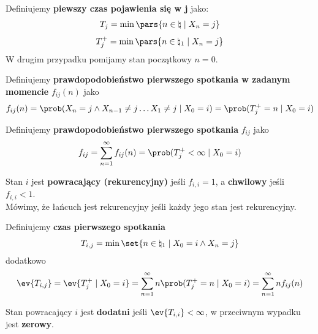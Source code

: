 \begin{definition}
	Definiujemy \textbf{piewszy czas pojawienia się w j} jako:
	\[
		T_j = \min\pars{n \in \natural \mid X_n = j}
	\]
	\[
		T_j^+ = \min\pars{n \in \natural_1 \mid X_n = j}
	\]
	W drugim przypadku pomijamy stan początkowy \( n = 0 \).
\end{definition}

\begin{definition}
	Definiujemy \textbf{prawdopodobieństwo pierwszego spotkania w zadanym momencie} \(f_{ij}(n)\)
	jako
	\[
		f_{ij}(n) = \prob(X_n = j \land X_{n-1} \neq j \dots X_{1} \neq j \mid X_0 = i) = \prob(T_j^+ = n \mid X_0 = i)
	\]
\end{definition}

\begin{definition}
	Definiujemy \textbf{prawdopodobieństwo pierwszego spotkania} \(f_{ij}\)
	jako
	\[
		f_{ij} = \sum_{n=1}^{\infty} f_{ij}(n) = \prob(T_j^+ < \infty \mid X_0 = i)
	\]
\end{definition}

\begin{definition}
	Stan \(i\) jest \textbf{powracający (rekurencyjny)} jeśli \( f_{i, i} = 1 \),
	a \textbf{chwilowy} jeśli \( f_{i, i} < 1 \). \\
	Mówimy, że łańcuch jest rekurencyjny jeśli każdy jego stan jest rekurencyjny.
\end{definition}

\begin{definition}
	Definiujemy \textbf{czas pierwszego spotkania} 
	\[
		T_{i, j} = \min \set{n \in \natural_1 \mid X_0 = i \land X_n = j}
	\]
	dodatkowo
	\[
		\ev{T_{i, j}} = \ev{T_j^+ \mid X_0 = i} = \sum_{n = 1}^\infty n \prob(T_j^+ = n \mid X_0 = i) = \sum_{n = 1}^\infty n f_{ij}(n)
	\]
\end{definition}

\begin{definition}
	Stan powracający \(i\) jest \textbf{dodatni} jeśli \(\ev{T_{i, i}} < \infty\),
	w przeciwnym wypadku jest \textbf{zerowy}.
\end{definition}

